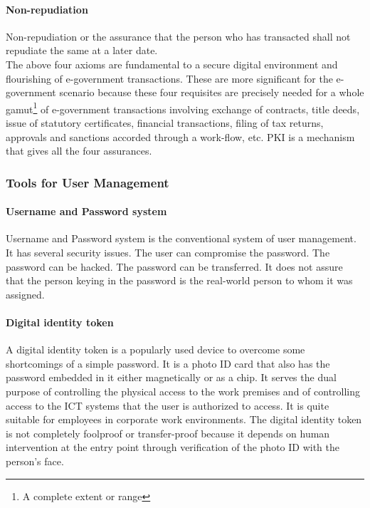   \paragraph*{ Non-repudiation}
  Non-repudiation or the assurance that the person who has transacted shall not
  repudiate the same at a later date.\\
  
  
  The above four axioms are fundamental to a secure digital environment and
  flourishing of e-government transactions. These are more significant for the e-government
  scenario because these four requisites are precisely needed for a whole gamut\footnote{A complete extent or range} of
  e-government transactions involving exchange of contracts, title deeds, issue of statutory
  certificates, financial transactions, filing of tax returns, approvals and sanctions accorded
  through a work-flow, etc. PKI is a mechanism that gives all the four assurances.
  
 \subsubsection*{Tools for User Management}
 \paragraph*{Username and Password system}
 Username and Password system is the conventional system of user management. It has
 several security issues. The user can compromise the password. The password can be
 hacked. The password can be transferred. It does not assure that the person keying in the
 password is the real-world person to whom it was assigned.
 
 \paragraph*{Digital identity token}
 A digital identity token is a popularly used device to overcome some
 shortcomings of a simple password. It is a photo ID card that also has the password
 embedded in it either magnetically or as a chip. It serves the dual purpose of controlling
 the physical access to the work premises and of controlling access to the ICT systems that
 the user is authorized to access. It is quite suitable for employees in corporate work
 environments. The digital identity token is not completely foolproof or transfer-proof
 because it depends on human intervention at the entry point through verification of the
 photo ID with the person's face.
 
